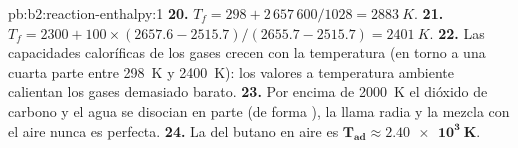 \begin{solution}{pb:b2:reaction-enthalpy:1}
\textbf{20.} $T_f = 298 + 2\,657\,600/1028 = \qty{2883}{K}$.
\textbf{21.} $T_f = 2300 + 100 \times (2657.6 - 2515.7)/(2655.7 - 2515.7) =
\qty{2401}{K}$.
\textbf{22.} Las capacidades caloríficas de los gases crecen con la temperatura (en
torno a una cuarta parte entre \qty{298}{K} y \qty{2400}{K}): los valores a temperatura
ambiente calientan los gases demasiado barato.
\textbf{23.} Por encima de \qty{2000}{K} el dióxido de carbono y el agua se disocian
en parte (de forma ), la llama radia y la mezcla con el aire nunca es perfecta.
\textbf{24.} La  del butano en aire es
$\boldsymbol{T_{\text{ad}} \approx \qty{2.40e3}{K}}$.
\end{solution}
